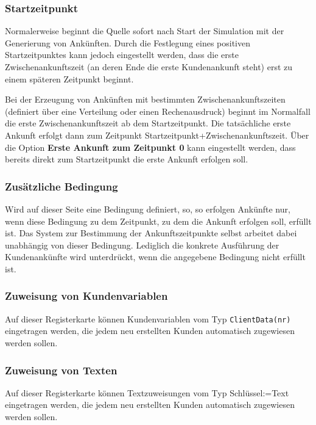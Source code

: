 \subsubsection*{Startzeitpunkt}

Normalerweise beginnt die Quelle sofort nach Start der Simulation mit der Generierung von
Ankünften. Durch die Festlegung eines positiven Startzeitpunktes kann jedoch eingestellt
werden, dass die erste Zwischenankunftszeit (an deren Ende die erste Kundenankunft steht) erst
zu einem späteren Zeitpunkt beginnt.

Bei der Erzeugung von Ankünften mit bestimmten Zwischenankunftszeiten (definiert über eine Verteilung
oder einen Rechenausdruck) beginnt im Normalfall die erste Zwischenankunftszeit ab dem Startzeitpunkt.
Die tatsächliche erste Ankunft erfolgt dann zum Zeitpunkt Startzeitpunkt+Zwischenankunftszeit. Über
die Option \textbf{Erste Ankunft zum Zeitpunkt 0} kann eingestellt werden, dass bereits direkt zum
Startzeitpunkt die erste Ankunft erfolgen soll.

\subsubsection*{Zusätzliche Bedingung}

Wird auf dieser Seite eine Bedingung definiert, so, so erfolgen Ankünfte nur, wenn diese Bedingung
zu dem Zeitpunkt, zu dem die Ankunft erfolgen soll, erfüllt ist.
Das System zur Bestimmung der Ankunftszeitpunkte selbst arbeitet dabei unabhängig von dieser Bedingung.
Lediglich die konkrete Ausführung der Kundenankünfte wird unterdrückt, wenn die angegebene Bedingung nicht erfüllt ist.

\subsubsection*{Zuweisung von Kundenvariablen}

Auf dieser Registerkarte können Kundenvariablen vom Typ \texttt{ClientData(nr)} eingetragen werden,
die jedem neu erstellten Kunden automatisch zugewiesen werden sollen.

\subsubsection*{Zuweisung von Texten}

Auf dieser Registerkarte können Textzuweisungen vom Typ Schlüssel:=Text eingetragen werden,
die jedem neu erstellten Kunden automatisch zugewiesen werden sollen.


